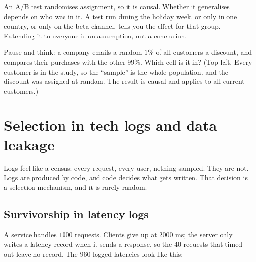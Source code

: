 \begin{intuitionbox}
An A/B test randomises assignment, so it is causal. Whether it generalises depends on
who was in it. A test run during the holiday week, or only in one country, or only on
the beta channel, tells you the effect for that group. Extending it to everyone is an
assumption, not a conclusion.
\end{intuitionbox}

\begin{recoverybox}
Pause and think: a company emails a random $1\%$ of all customers a discount, and
compares their purchases with the other $99\%$. Which cell is it in? (Top-left. Every
customer is in the study, so the ``sample'' is the whole population, and the discount
was assigned at random. The result is causal and applies to all current customers.)
\end{recoverybox}

\section{Selection in tech logs and data leakage}
\label{sec:sampling-logs}

Logs feel like a census: every request, every user, nothing sampled. They are not. Logs
are produced by code, and code decides what gets written. That decision is a selection
mechanism, and it is rarely random.

\subsection{Survivorship in latency logs}

A service handles $1000$ requests. Clients give up at $2000$ ms; the server only writes a
latency record when it sends a response, so the $40$ requests that timed out leave no
record. The $960$ logged latencies look like this:

